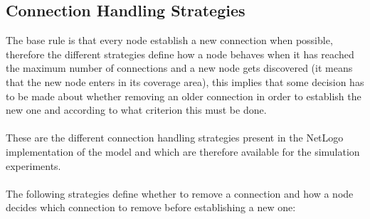 \documentclass{llncs}
\begin{document}
\subsection{Connection Handling Strategies}
%
The base rule is that every node establish a new connection when possible, therefore the different strategies define how a node behaves when it has reached the maximum number of connections and a new node gets discovered (it means that the new node enters in its coverage area), this implies that some decision has to be made about whether removing an older connection in order to establish the new one and according to what criterion this must be done.\\\\
%
These are the different connection handling strategies present in the NetLogo implementation of the model and which are therefore available for the simulation experiments.\\\\
The following strategies define whether to remove a connection and how a node decides which connection to remove before establishing a new one:\\
\end{document}
